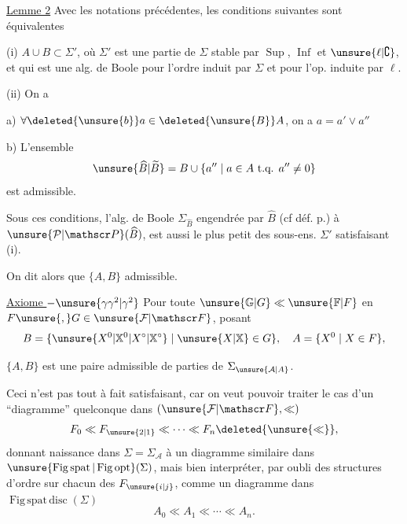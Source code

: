 
\uline{Lemme 2} Avec les notations précédentes, les conditions suivantes sont équivalentes

(i) $A\cup B\subset\Sigma'$, où $\Sigma'$ est une partie de $\Sigma$ stable par $\operatorname{Sup}$, $\operatorname{Inf}$ et $\unsure{\ell|\complement}$, et qui est une alg. de Boole pour l'ordre induit par $\Sigma$ et pour l'op. induite par $\ell$.

(ii) On a

 a) $\forall\deleted{\unsure{b}}a\in\deleted{\unsure{B}}A$, on a $a=a'\vee a''$

 b)  L'ensemble 
\[
\unsure{\widehat B|\widetilde B}=B\cup\{a''\mid a\in A\text{ t.q. }a''\ne0\}
\]
est admissible.

Sous ces conditions, l'alg. de Boole $\Sigma_{\widehat B}$ engendrée par $\widehat B$ (cf déf. p.)   à $\unsure{\mathcal P|\mathscr P}(\widehat B)$, est aussi le plus petit des sous-ens. $\Sigma'$ satisfaisant (i).

On dit alors que $\{A,B\}$  admissible.

\uline{Axiome  $-\unsure{\gamma\gamma^2|\gamma^2}$} Pour toute  $\unsure{\mathbb G|G}\ll\unsure{\mathbb F|F}$ en $F\unsure{,}G\in\unsure{\mathcal F|\mathscr F}$, posant
\[
B=\{\unsure{X^0|\mathbb X^0|X^\circ|\mathbb X^\circ}\mid\unsure{X|\mathbb X}\in G\},\quad A=\{X^0\mid X\in F\},
\]


 $\{A,B\}$ est une paire admissible de parties de $\Sigma_{\unsure{\mathcal A|A}}$.

Ceci n'est pas tout à fait satisfaisant, car on veut pouvoir traiter le cas d'un ``diagramme'' quelconque dans $(\unsure{\mathcal F|\mathscr F},\ll)$
\[
F_0\ll F_{\unsure{2|1}}\ll\cdots\ll F_n\deleted{\unsure{\ll}},
\]
donnant naissance dans $\Sigma=\Sigma_{\mathcal A}$ à un diagramme similaire dans $\unsure{\operatorname{Fig\,spat}|\operatorname{Fig\,opt}}(\Sigma)$, mais   bien interpréter, par oubli des structures d'ordre  sur  chacun des $F_{\unsure{i|j}}$, comme un diagramme dans $\operatorname{Fig\,spat\,disc}(\Sigma)$
\[
A_0\ll A_1\ll\cdots\ll A_n.
\]

